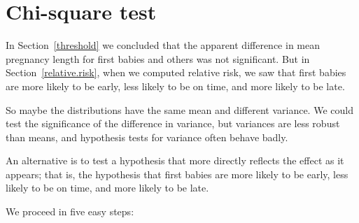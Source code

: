 \documentclass[12pt]{book}
\begin{document}
\section{Chi-square test}

In Section~\ref{threshold} we concluded that the apparent difference
in mean pregnancy length for first babies and others was not
significant.  But in Section~\ref{relative.risk}, when we computed
relative risk, we saw that first babies are more likely to be early,
less likely to be on time, and more likely to be late.

So maybe the distributions have the same mean and different variance.
We could test the significance of the difference in variance, but
variances are less robust than means, and hypothesis tests for
variance often behave badly.

An alternative is to test a hypothesis that more directly reflects the
effect as it appears; that is, the hypothesis that first babies are
more likely to be early, less likely to be on time, and more likely to
be late.

We proceed in five easy steps:
\end{document}
